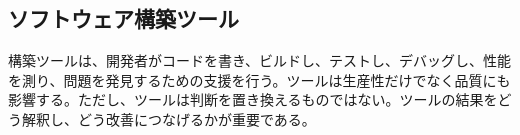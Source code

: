 \subsection{ソフトウェア構築ツール}

構築ツールは、開発者がコードを書き、ビルドし、テストし、デバッグし、性能を測り、問題を発見するための支援を行う。ツールは生産性だけでなく品質にも影響する。ただし、ツールは判断を置き換えるものではない。ツールの結果をどう解釈し、どう改善につなげるかが重要である。
